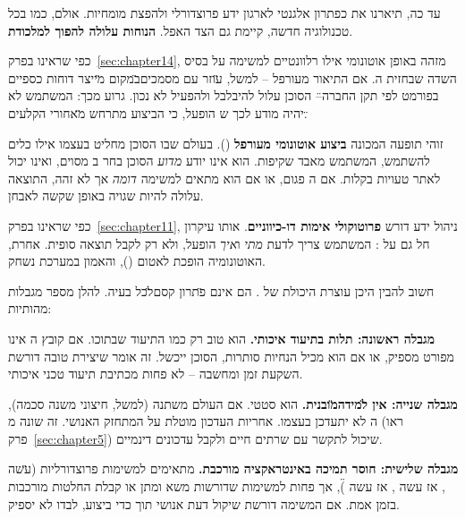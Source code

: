 \label{sec:chapter16}


עד כה, תיארנו את  כפתרון אלגנטי לארגון ידע פרוצדורלי ולהפצת מומחיות. אולם, כמו בכל טכנולוגיה חדשה, קיימת גם הצד האפל. \textbf{הנוחות עלולה להפוך למלכודת}.

כפי שראינו בפרק~\ref{sec:chapter14},  מזהה באופן אוטונומי אילו  רלוונטיים למשימה על בסיס השדה  שבחזית ה\cite{anthropic2025invocation}. אם התיאור מעורפל – למשל, \"עוזר עם מסמכים\" במקום \"מייצר דוחות כספיים בפורמט  לפי תקן החברה\" – הסוכן עלול להיבלבל ולהפעיל  לא נכון. גרוע מכך: המשתמש לא יהיה מודע לכך ש הופעל, כי הביצוע מתרחש \"מאחורי הקלעים\".

זוהי תופעה המכונה \textbf{ביצוע אוטונומי מעורפל} (). בעולם שבו הסוכן מחליט בעצמו אילו כלים להשתמש, המשתמש מאבד שקיפות. הוא אינו יודע \textit{מדוע} הסוכן בחר ב מסוים, ואינו יכול לאתר טעויות בקלות. אם ה פגום, או אם הוא מתאים למשימה \textit{דומה} אך לא זהה, התוצאה עלולה להיות שגויה באופן שקשה לאבחן.

כפי שראינו בפרק~\ref{sec:chapter11}, ניהול ידע דורש \textbf{פרוטוקולי אימות דו-כיווניים}. אותו עיקרון חל גם על : המשתמש צריך לדעת \textit{מתי} ו\textit{איך}  הופעל, ולא רק לקבל תוצאה סופית. אחרת, האוטונומיה הופכת לאטום (), והאמון במערכת נשחק.


חשוב להבין היכן עוצרת היכולת של . הם אינם \"פתרון קסם\" לכל בעיה. להלן מספר מגבלות מהותיות:

\textbf{מגבלה ראשונה: תלות בתיעוד איכותי.}  הוא טוב רק כמו התיעוד שבתוכו. אם קובץ ה אינו מפורט מספיק, או אם הוא מכיל הנחיות סותרות, הסוכן ייכשל. זה אומר שיצירת  טובה דורשת השקעת זמן ומחשבה – לא פחות מכתיבת תיעוד טכני איכותי.

\textbf{מגבלה שנייה: אין \"למידה\" מובנית.}  הוא סטטי. אם העולם משתנה (למשל,  חיצוני משנה סכמה), ה לא יתעדכן בעצמו. אחריות העדכון מוטלת על המתחזק האנושי. זה שונה מ (ראו פרק~\ref{sec:chapter5}) שיכול לתקשר עם שרתים חיים ולקבל עדכונים דינמיים.

\textbf{מגבלה שלישית: חוסר תמיכה באינטראקציה מורכבת.}  מתאימים למשימות פרוצדורליות (\"עשה , אז עשה , אז עשה \"), אך פחות למשימות שדורשות משא ומתן או קבלת החלטות מורכבות בזמן אמת. אם המשימה דורשת שיקול דעת אנושי תוך כדי ביצוע,  לבדו לא יספיק.

